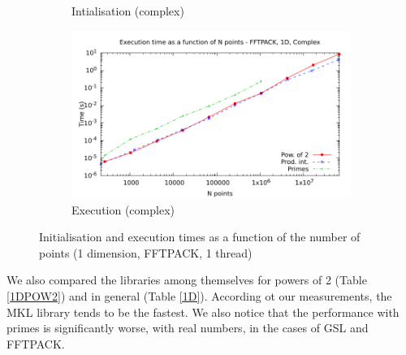 \documentclass[12pt, a4paper]{article}
\begin{document}
\begin{figure}[H]
\begin{subfigure}{.5\textwidth}
\caption{Intialisation (complex)}
\label{1DFFTPACKCI}
\end{subfigure}%
\begin{subfigure}{.5\textwidth}
\centering
\includegraphics[width=.9\linewidth]{graphs/1d-fftpack-exec-c.pdf}
\caption{Execution (complex)}
\label{1DFFTPACKC}
\end{subfigure}
\caption{Initialisation and execution times as a function of the number of points (1 dimension, FFTPACK, 1 thread)}
\label{1DFFTPACK}
\end{figure}

We also compared the libraries among themselves for powers of 2 (Table \ref{1DPOW2}) and in general (Table \ref{1D}).  According ot our measurements, the MKL library tends to be the fastest. We also notice that the performance with primes is significantly worse, with real numbers, in the cases of GSL and FFTPACK.
\end{document}
